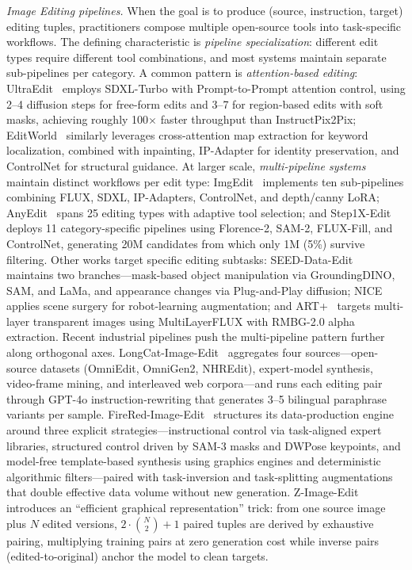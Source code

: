 \emph{Image Editing pipelines.}
When the goal is to produce (source, instruction, target) editing tuples, practitioners compose multiple open-source tools into task-specific workflows. The defining characteristic is \emph{pipeline specialization}: different edit types require different tool combinations, and most systems maintain separate sub-pipelines per category. A common pattern is \emph{attention-based editing}: UltraEdit~\citep{zhao2024ultraedit} employs SDXL-Turbo with Prompt-to-Prompt attention control, using 2--4 diffusion steps for free-form edits and 3--7 for region-based edits with soft masks, achieving roughly 100$\times$ faster throughput than InstructPix2Pix; EditWorld~\citep{zeng2025editworld} similarly leverages cross-attention map extraction for keyword localization, combined with inpainting, IP-Adapter for identity preservation, and ControlNet for structural guidance. At larger scale, \emph{multi-pipeline systems} maintain distinct workflows per edit type: ImgEdit~\citep{ye2025imgedit} implements ten sub-pipelines combining FLUX, SDXL, IP-Adapters, ControlNet, and depth/canny LoRA; AnyEdit~\citep{yu2025anyedit} spans 25 editing types with adaptive tool selection; and Step1X-Edit~\citep{liu2025step1x} deploys 11 category-specific pipelines using Florence-2, SAM-2, FLUX-Fill, and ControlNet, generating 20M candidates from which only 1M (5\%) survive filtering. Other works target specific editing subtasks: SEED-Data-Edit~\citep{ge2024seed} maintains two branches---mask-based object manipulation via GroundingDINO, SAM, and LaMa, and appearance changes via Plug-and-Play diffusion; NICE~\citep{pakdamansavoji2025improving} applies scene surgery for robot-learning augmentation; and ART+~\citep{pu2025art} targets multi-layer transparent images using MultiLayerFLUX with RMBG-2.0 alpha extraction. Recent industrial pipelines push the multi-pipeline pattern further along orthogonal axes. LongCat-Image-Edit~\citep{team2025longcat} aggregates four sources---open-source datasets (OmniEdit, OmniGen2, NHREdit), expert-model synthesis, video-frame mining, and interleaved web corpora---and runs each editing pair through GPT-4o instruction-rewriting that generates 3--5 bilingual paraphrase variants per sample. FireRed-Image-Edit~\citep{team2026firered} structures its data-production engine around three explicit strategies---instructional control via task-aligned expert libraries, structured control driven by SAM-3 masks and DWPose keypoints, and model-free template-based synthesis using graphics engines and deterministic algorithmic filters---paired with task-inversion and task-splitting augmentations that double effective data volume without new generation. Z-Image-Edit~\citep{cai2025z} introduces an ``efficient graphical representation'' trick: from one source image plus $N$ edited versions, $2\cdot\binom{N}{2}+1$ paired tuples are derived by exhaustive pairing, multiplying training pairs at zero generation cost while inverse pairs (edited-to-original) anchor the model to clean targets.

